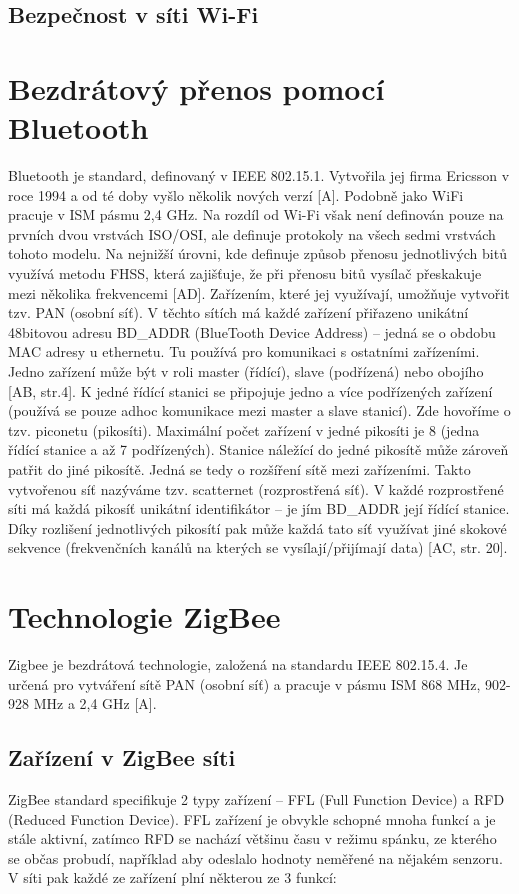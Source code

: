 \subsection*{Bezpečnost v síti Wi-Fi}
\section{Bezdrátový přenos pomocí Bluetooth}
Bluetooth je standard, definovaný v IEEE 802.15.1. Vytvořila jej firma Ericsson v roce 1994 a od té doby vyšlo několik nových verzí [A]. Podobně jako WiFi pracuje v ISM pásmu 2,4 GHz. Na rozdíl od Wi-Fi však není definován pouze na prvních dvou vrstvách ISO/OSI, ale definuje protokoly na všech sedmi vrstvách tohoto modelu. Na nejnižší úrovni, kde definuje způsob přenosu jednotlivých bitů využívá metodu FHSS, která zajišťuje, že při přenosu bitů vysílač přeskakuje mezi několika frekvencemi [AD].\newline
Zařízením, které jej využívají, umožňuje vytvořit tzv. PAN (osobní síť). V těchto sítích má každé zařízení přiřazeno unikátní 48bitovou adresu BD\_ADDR (BlueTooth Device Address) – jedná se o obdobu MAC adresy u ethernetu. Tu používá pro komunikaci s ostatními zařízeními. Jedno zařízení může být v roli master (řídící), slave (podřízená) nebo obojího [AB, str.4]. K jedné řídící stanici se připojuje jedno a více podřízených zařízení (používá se pouze adhoc komunikace mezi master a slave stanicí). Zde hovoříme o tzv. piconetu (pikosíti). Maximální počet zařízení v jedné pikosíti je 8 (jedna řídící stanice a až 7 podřízených). Stanice náležící do jedné pikosítě může zároveň patřit do jiné pikosítě. Jedná se tedy o rozšíření sítě mezi zařízeními. Takto vytvořenou síť nazýváme tzv. scatternet (rozprostřená síť). V každé rozprostřené síti má každá pikosíť unikátní identifikátor – je jím BD\_ADDR její řídící stanice. Díky rozlišení jednotlivých pikosítí pak může každá tato síť využívat jiné skokové sekvence (frekvenčních kanálů na kterých se vysílají/přijímají data) [AC, str. 20].

\section{Technologie ZigBee}
Zigbee je bezdrátová technologie, založená na standardu IEEE 802.15.4. Je určená pro vytváření sítě PAN (osobní síť) a pracuje v pásmu ISM 868 MHz, 902-928 MHz a 2,4 GHz [A]. 

\subsection*{Zařízení v ZigBee síti}
ZigBee standard specifikuje 2 typy zařízení – FFL (Full Function Device) a RFD (Reduced Function Device). FFL zařízení je obvykle schopné mnoha funkcí a je stále aktivní, zatímco RFD se nachází většinu času v režimu spánku, ze kterého se občas probudí, například aby odeslalo hodnoty neměřené na nějakém senzoru.\newline
V síti pak každé ze zařízení plní některou ze 3 funkcí:

